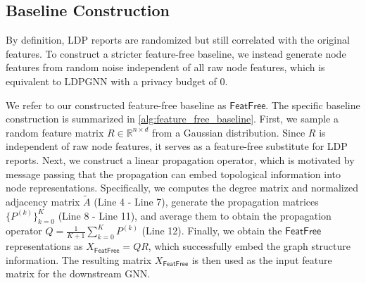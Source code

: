 \documentclass[conference,compsoc]{IEEEtran}
\theoremstyle{boldplain}
\theoremstyle{bolddefinition}
\theoremstyle{remark}
\newcommand{\ff}{\ensuremath{\mathsf{FeatFree}}\xspace}
\newcommand{\ldpgnn}{LDPGNN\xspace}
\begin{document}
\subsection{Baseline Construction}
\label{sec:baseline_construction}




By definition, LDP reports are randomized but still correlated with the original features.
To construct a stricter feature-free baseline, we instead generate node features from random noise independent of all raw node features, which is equivalent to \ldpgnn with a privacy budget of $0$.


We refer to our constructed feature-free baseline as \ff.
The specific baseline construction is summarized in \autoref{alg:feature_free_baseline}.
First, we sample a random feature matrix $R\in\mathbb{R}^{n\times d}$ from a Gaussian distribution. 
Since $R$ is independent of raw node features, it serves as a feature-free substitute for LDP reports.
Next, we construct a linear propagation operator, which is motivated by message passing that the propagation can embed topological information into node representations. 
Specifically, we computes the degree matrix and normalized adjacency matrix $\widetilde A$ (Line 4 - Line 7), generate the propagation matrices $\{P^{(k)}\}_{k=0}^{K}$ (Line 8 - Line 11), and average them to obtain the propagation operator $Q=\frac{1}{K+1}\sum_{k=0}^{K}P^{(k)}$ (Line 12).
Finally, we obtain the \ff representations as $X_{\ff}=QR$, which successfully embed the graph structure information. The resulting matrix $X_{\ff}$ is then used as the input feature matrix for the downstream GNN.






 
        
\end{document}
